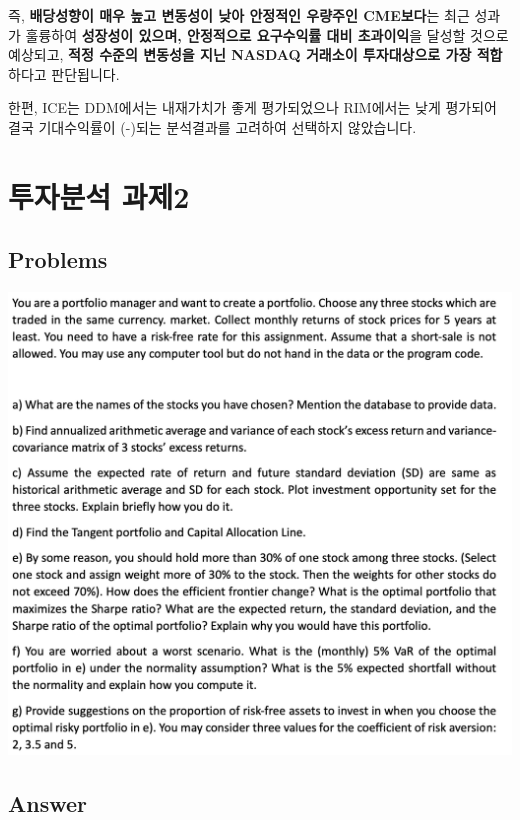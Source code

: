 \documentclass[
  a4paper,
  DIV=11,
  numbers=noendperiod]{scrreprt}
\begin{document}
즉, \textbf{배당성향이 매우 높고 변동성이 낮아 안정적인 우량주인
CME보다}는 최근 성과가 훌륭하여 \textbf{성장성이 있으며, 안정적으로
요구수익률 대비 초과이익}을 달성할 것으로 예상되고, \textbf{적정 수준의
변동성을 지닌 NASDAQ 거래소이 투자대상으로 가장 적합}하다고 판단됩니다.

한편, ICE는 DDM에서는 내재가치가 좋게 평가되었으나 RIM에서는 낮게
평가되어 결국 기대수익률이 (-)되는 분석결과를 고려하여 선택하지
않았습니다.

\chapter*{투자분석 과제2}\label{uxd22cuxc790uxbd84uxc11d-uxacfcuxc81c2}


\section*{Problems}\label{problems}


\includegraphics{images/investment_hw2.png}

\section*{Answer}\label{answer-10}
\end{document}
